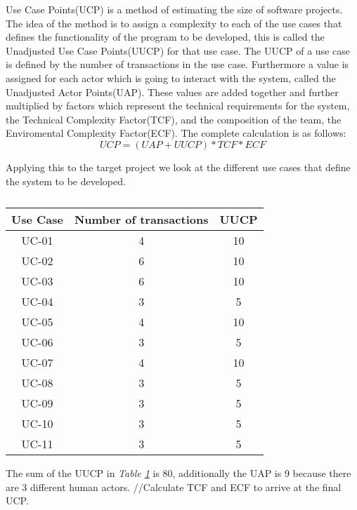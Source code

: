 Use Case Points(UCP) is a method of estimating the size of software projects. The idea of the method is to assign a complexity to each of the use cases that defines the functionality of the  program to be developed, this is called the Unadjusted Use Case Points(UUCP) for that use case. The UUCP of a use case is defined by the number of transactions in the use case. Furthermore a value is assigned for each actor which is going to interact with the system, called the Unadjusted Actor Points(UAP). These values are added together and further multiplied by factors which represent the technical requirements for the system, the Technical Complexity Factor(TCF), and the composition of the team, the Enviromental Complexity Factor(ECF). The complete calculation is as follows: \[UCP = (UAP + UUCP)*TCF*ECF\] 

Applying this to the target project we look at the different use cases that define the system to be developed. 
\begin{table}[!h] 
\begin{tabular}{|c|c|c|}
\hline Use Case & Number of transactions & UUCP  \\ 
\hline UC-01 & 4 & 10  \\ 
\hline UC-02 & 6 & 10 \\
\hline UC-03 & 6 & 10 \\
\hline UC-04 & 3 & 5 \\
\hline UC-05 & 4 & 10 \\
\hline UC-06 & 3 & 5 \\
\hline UC-07 & 4 & 10 \\
\hline UC-08 & 3 & 5 \\
\hline UC-09 & 3 & 5 \\
\hline UC-10 & 3 & 5 \\
\hline UC-11 & 3 & 5 \\
\hline
\end{tabular}
\caption{} \label{tab:UUCP}
\end{table}

The sum of the UUCP in \textit{Table \ref{tab:UUCP}} is 80, additionally the UAP is 9 because there are 3 different human actors. 
//Calculate TCF and ECF to arrive at the final UCP.
